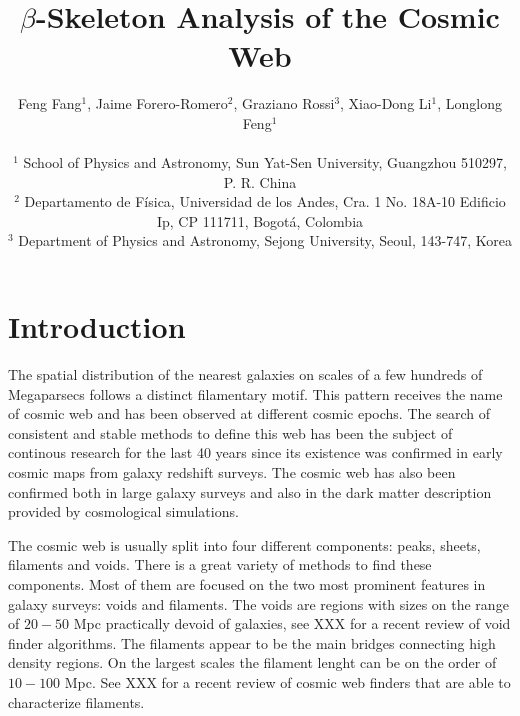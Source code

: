 \documentclass[useAMS,usenatbib]{mnras}
\begin{document}
\title[$\beta$-Skeleton Analysis]{$\beta$-Skeleton Analysis of the Cosmic Web}

\author[Fang, Forero-Romero, Rossi, Li \& Feng (2018)]
{Feng Fang$^1$, Jaime Forero-Romero$^2$, Graziano Rossi$^3$, Xiao-Dong Li$^1$, Longlong Feng$^1$ \\ \\
$^1$ School of Physics and Astronomy, Sun Yat-Sen University, Guangzhou 510297, P. R. China \\
$^2$ Departamento de F{\'i}sica, Universidad de los Andes, Cra. 1 No. 18A-10 Edificio Ip, CP 111711, Bogot{\'a}, Colombia \\
$^3$ Department of Physics and Astronomy, Sejong University, Seoul, 143-747, Korea}

\pagerange{\pageref{firstpage}--\pageref{lastpage}} 
\maketitle
\label{firstpage}


 

\section{Introduction}

The spatial distribution of the nearest galaxies on scales of a few
hundreds of Megaparsecs follows a distinct filamentary motif.
This pattern receives the name of cosmic web and has been observed at
different cosmic epochs.  
The search of consistent and stable methods to define this web has
been the subject of continous research for the last 40 years since its
existence was confirmed in early cosmic maps from galaxy redshift surveys.
The cosmic web has also been confirmed both in large galaxy surveys
and also in the dark matter description provided by cosmological
simulations.  

The cosmic web is usually split into four different components: peaks,
sheets, filaments and voids.
There is a great variety of methods to find these components. 
Most of them are focused on the two most prominent features in galaxy
surveys: voids and filaments. 
The voids are regions with sizes on the range of $20-50$ Mpc
practically devoid of galaxies, see XXX for a recent review of
void finder algorithms.
The filaments appear to be the main bridges connecting high
density regions. 
On the largest scales the filament lenght can be on the order of
$10-100$ Mpc.
See XXX for a recent review of cosmic web finders that are able to
characterize filaments. 
\end{document}
